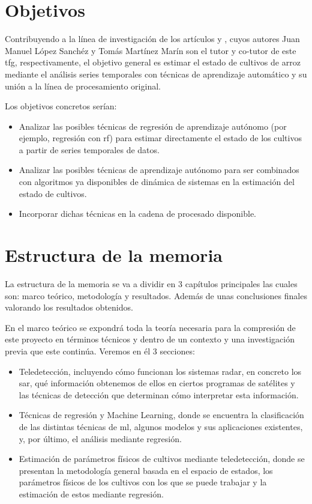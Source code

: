 \section{Objetivos}
Contribuyendo a la línea de investigación de los artículos \cite{Juanma2014} y \cite{Juanma2016}, cuyos autores Juan Manuel López Sanchéz y Tomás Martínez Marín son el tutor y co-tutor de este \gls{tfg}, respectivamente, el objetivo general es estimar el estado de cultivos de arroz mediante el análisis series temporales con técnicas de aprendizaje automático y su unión a la línea de procesamiento original.
\\
\par Los objetivos concretos serían: 
\begin{itemize}
	\item Analizar las posibles técnicas de regresión de aprendizaje autónomo (por ejemplo, regresión con \gls{rf}) para estimar directamente el estado de los cultivos a partir de series temporales de datos. 
	\item Analizar las posibles técnicas de aprendizaje autónomo para ser combinados con algoritmos ya disponibles de dinámica de sistemas en la estimación del estado de cultivos.
	\item Incorporar dichas técnicas en la cadena de procesado disponible.
\end{itemize}

\section{Estructura de la memoria}
\par La estructura de la memoria se va a dividir en 3 capítulos principales las cuales son: marco teórico, metodología y resultados. Además de unas conclusiones finales valorando los resultados obtenidos.
\\
\par En el marco teórico se expondrá toda la teoría necesaria para la compresión de este proyecto en términos técnicos y dentro de un contexto y una investigación previa que este continúa. Veremos en él 3 secciones:
\begin{itemize}
	\item Teledetección, incluyendo cómo funcionan los sistemas radar, en concreto los \gls{sar}, qué información obtenemos de ellos en ciertos programas de satélites y las técnicas de detección que determinan cómo interpretar esta información.
	\item Técnicas de regresión y Machine Learning, donde se encuentra la clasificación de las distintas técnicas de \gls{ml}, algunos modelos y sus aplicaciones existentes, y, por último, el análisis mediante regresión. 
	\item Estimación de parámetros físicos de cultivos mediante
teledetección, donde se presentan la metodología general basada en el espacio de estados, los parámetros físicos de los cultivos con los que se puede trabajar y la estimación de estos mediante regresión. 
\end{itemize}

